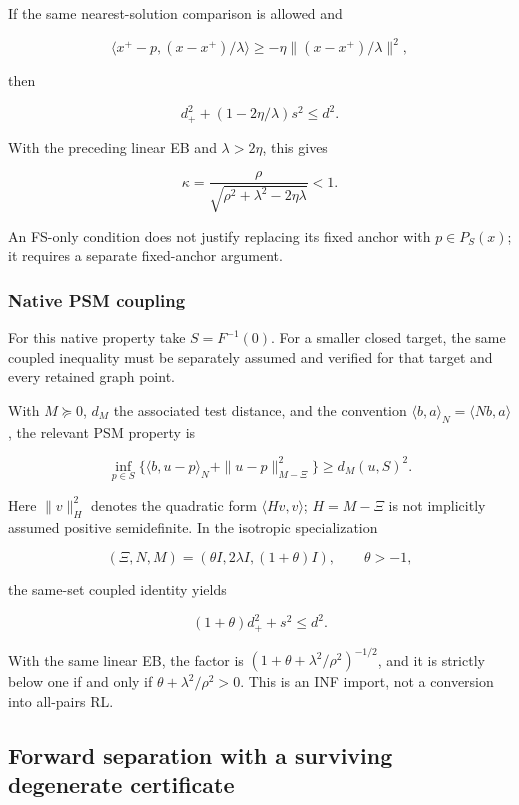 \documentclass[11pt,a4paper]{article}
\theoremstyle{plain}
\theoremstyle{definition}
\theoremstyle{remark}
\begin{document}
If the same nearest-solution comparison is allowed and

\[
\langle x^+-p,(x-x^+)/\lambda\rangle
\ge-\eta\|(x-x^+)/\lambda\|^2,
\]

then

\[
d_+^2+(1-2\eta/\lambda)s^2\le d^2.
\]

With the preceding linear EB and \(\lambda>2\eta\), this gives

\[
\kappa=\frac{\rho}{\sqrt{\rho^2+\lambda^2-2\eta\lambda}}<1.
\]

An FS-only condition does not justify replacing its fixed anchor with
\(p\in P_S(x)\); it requires a separate fixed-anchor argument.

\hypertarget{native-psm-coupling}{%
\subsubsection{Native PSM coupling}\label{native-psm-coupling}}

For this native property take \(S=F^{-1}(0)\). For a smaller closed
target, the same coupled inequality must be separately assumed and
verified for that target and every retained graph point.

With \(M\succeq0\), \(d_M\) the associated test distance, and the
convention \(\langle b,a\rangle_N=\langle Nb,a\rangle\), the relevant
PSM property is

\[
\inf_{p\in S}\{
\langle b,u-p\rangle_N+\|u-p\|_{M-\Xi}^2
\}\ge d_M(u,S)^2.
\]

Here \(\|v\|_H^2\) denotes the quadratic form \(\langle Hv,v\rangle\);
\(H=M-\Xi\) is not implicitly assumed positive semidefinite. In the
isotropic specialization

\[
(\Xi,N,M)=(\theta I,2\lambda I,(1+\theta)I),\qquad\theta>-1,
\]

the same-set coupled identity yields

\[
(1+\theta)d_+^2+s^2\le d^2.
\]

With the same linear EB, the factor is
\((1+\theta+\lambda^2/\rho^2)^{-1/2}\), and it is strictly below one if
and only if \(\theta+\lambda^2/\rho^2>0\). This is an INF import, not a
conversion into all-pairs RL.

\hypertarget{forward-separation-with-a-surviving-degenerate-certificate}{%
\subsection{Forward separation with a surviving degenerate
certificate}\label{forward-separation-with-a-surviving-degenerate-certificate}}
\end{document}
